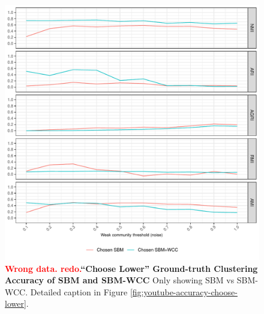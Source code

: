 \documentclass[aps,pre,superscriptaddress]{revtex4}
\begin{document}
\begin{figure}[!htpb]
	\centering
	\includegraphics[]{figures/choose_lower_youtube_sbm_accuracy.pdf}
	\caption[]{\textbf{\textcolor{red}{Wrong data. redo.}``Choose Lower'' Ground-truth Clustering Accuracy of SBM and SBM-WCC} Only showing SBM vs SBM-WCC. Detailed caption in Figure \ref{fig:youtube-accuracy-choose-lower}.}
	\label{fig:choose-lower-sbm}
\end{figure}
\end{document}
